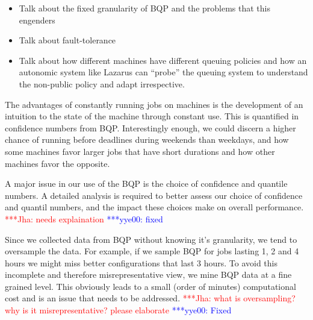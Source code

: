 \documentclass[conference,final]{IEEEtran}
\newcommand{\jhanote}[1]{ {\textcolor{red} { ***Jha: #1 }}}
\newcommand{\yyenote}[1]{ {\textcolor{blue} { ***yye00: #1 }}}
\newcommand{\jhanote}[1]{}
\newcommand{\yyenote}[1]{}
\begin{document}
\begin{itemize}
\item Talk about the fixed granularity of BQP and the problems that this
engenders
\item Talk about fault-tolerance
\item Talk about how different machines have different queuing policies
  and how an autonomic system like Lazarus can ``probe'' the queuing
  system to understand the non-public policy and adapt irrespective.
\end{itemize}



The advantages of constantly running jobs on machines is the
development of an intuition to the state of the machine through
constant use. This is quantified in confidence numbers from
BQP. Interestingly enough, we could discern a higher chance of running
before deadlines during weekends than weekdays, and how some machines
favor larger jobs that have short durations and how other machines
favor the opposite.

A major issue in our use of the BQP is the choice of confidence and quantile
numbers. A detailed analysis is required to better assess our choice
of confidence and quantil numbers, and the impact
these choices make on overall performance. \jhanote{needs explaination}\yyenote{fixed}

Since we collected data from BQP without knowing it's granularity, we
tend to oversample the data. For example, if we sample
BQP for jobs lasting 1, 2 and 4 hours we might miss
better configurations that last 3 hours. To avoid this
incomplete and therefore misrepresentative view, we mine
BQP data at a fine grained level. This obviously leads to a small (order of
minutes) computational cost and is an issue that needs to be
addressed. \jhanote{what is oversampling? why is it misrepresentative?
  please elaborate} \yyenote{Fixed}
\end{document}
